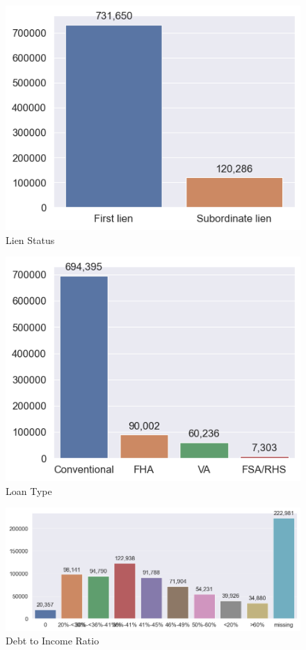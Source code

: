 \begin{figure}[h]
    \begin{minipage}{0.5\textwidth}
        \centering
        \includegraphics[width=\textwidth]{images/HMDA_features/HMDA_features_lien.png}
        \small
        Lien Status
    \end{minipage}\hfill
    \begin{minipage}{0.5\textwidth}
        \centering
        \includegraphics[width=\textwidth]{images/HMDA_features/HMDA_features_type.png} 
        \small
        Loan Type
    \end{minipage}


    \centering
    \includegraphics[width=\textwidth]{images/HMDA_features/HMDA_features_dtir.png}
    \small
    Debt to Income Ratio


\end{figure}

